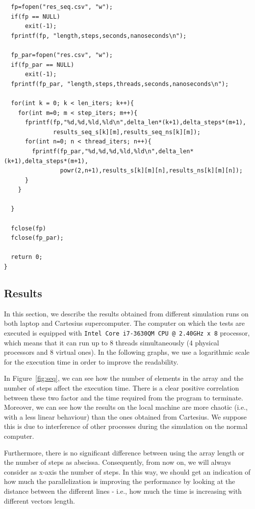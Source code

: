 \documentclass[a4paper]{article}
\begin{document}
\begin{verbatim}
  fp=fopen("res_seq.csv", "w");
  if(fp == NULL)
      exit(-1);
  fprintf(fp, "length,steps,seconds,nanoseconds\n");

  fp_par=fopen("res.csv", "w");
  if(fp_par == NULL)
      exit(-1);
  fprintf(fp_par, "length,steps,threads,seconds,nanoseconds\n");

  for(int k = 0; k < len_iters; k++){
    for(int m=0; m < step_iters; m++){
      fprintf(fp,"%d,%d,%ld,%ld\n",delta_len*(k+1),delta_steps*(m+1),
              results_seq_s[k][m],results_seq_ns[k][m]);
      for(int n=0; n < thread_iters; n++){
        fprintf(fp_par,"%d,%d,%d,%ld,%ld\n",delta_len*(k+1),delta_steps*(m+1),
                powr(2,n+1),results_s[k][m][n],results_ns[k][m][n]);
      }
    }

  }

  fclose(fp)
  fclose(fp_par);

  return 0;
}
\end{verbatim}

\newpage

\subsection{Results}

In this section, we describe the results obtained from different simulation runs on both laptop and Cartesius supercomputer. The computer on which the tests are executed is equipped with \texttt{Intel Core i7-3630QM CPU @ 2.40GHz x 8} processor, which means that it can run up to 8 threads simultaneously (4 physical processors and 8 virtual ones). In the following graphs, we use a logarithmic scale for the execution time in order to improve the readability.

In Figure~\ref{fig:seq}, we can see how the number of elements in the array and the number of steps affect the execution time. There is a clear positive correlation between these two factor and the time required from the program to terminate. Moreover, we can see how the results on the local machine are more chaotic (i.e., with a less linear behaviour) than the ones obtained from Cartesius. We suppose this is due to interference of other processes during the simulation on the normal computer.

Furthermore, there is no significant difference between using the array length or the number of steps as abscissa. Consequently, from now on, we will always consider as x-axis the number of steps. In this way, we should get an indication of how much the parallelization is improving the performance by looking at the distance between the different lines - i.e., how much the time is increasing with different vectors length.  
\end{document}
